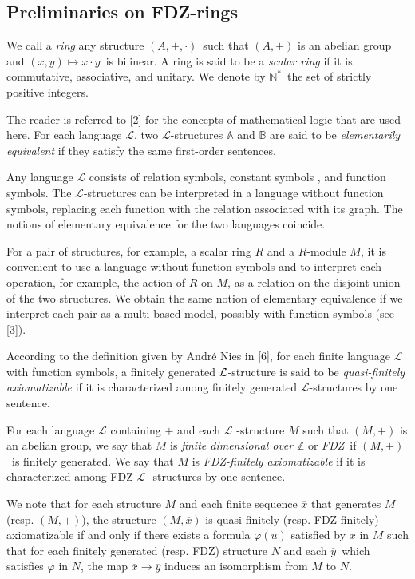 \documentclass{article}
\theoremstyle{remark}
\begin{document}
\subsection{Preliminaries on FDZ-rings}


We call a \emph{ring} any structure $(A,+,\cdot)$\ such that $(A,+)$ is an
abelian group and $(x,y)\mapsto x\cdot y$\ is bilinear. A ring is said to be a 
\emph{scalar ring} if it is commutative, associative, and unitary. We denote
by $%
\mathbb{N}
^{\ast }$\ the set of strictly positive integers.

The reader is referred to [2] for the concepts of mathematical logic that
are used here. For each language $\mathcal{L}$, two $\mathcal{L}$-structures 
$\mathbb A$ and  $\mathbb B$ are said to be \emph{elementarily equivalent} if they satisfy the same
first-order sentences.

Any language $\mathcal{L}$ consists of relation symbols, constant symbols
, and function symbols. The $\mathcal{L}$-structures can be interpreted in a
language without function symbols, replacing each function with the relation
associated with its graph. The notions of elementary equivalence for the two
languages coincide.

For a pair of structures, for example, a scalar ring $R$ and a $R$-module $M$, it
is convenient to use a language without function symbols and to interpret each
operation, for example, the action of $R$ on $M$, as a relation on the
disjoint union of the two structures. We obtain the same notion of
elementary equivalence if we interpret each pair as a multi-based model,
possibly with function symbols (see [3]).

According to the definition given by Andr\'{e} Nies in [6], for each finite
language $\mathcal{L}$ with function symbols, a finitely generated $\mathcal{%
L}$-structure is said to be \emph{quasi-finitely axiomatizable} if it is
characterized among finitely generated $\mathcal{L}$-structures by one
sentence.

For each language $\mathcal{L}$ containing $+$ and each $\mathcal{L}$
-structure $M$ such that $(M,+)$ is an abelian group, we say that $M$ is 
\emph{finite dimensional over }$%
\mathbb{Z}
$ or \emph{FDZ}\ if $(M,+)$\ is finitely generated. We say that $M$ is \emph{%
FDZ-finitely axiomatizable} if it is characterized among FDZ $\mathcal{L}$%
-structures by one sentence.

We note that for each structure $M$ and each finite sequence $\overline{x}$
that generates $M$ (resp. $(M,+)$), the structure $(M,\overline{x})$ is
quasi-finitely (resp. FDZ-finitely) axiomatizable if and only if there
exists a formula $\varphi (\overline{u})$ satisfied by $\overline{x}$ in $M$
such that for each finitely generated (resp. FDZ) structure $N$ and each $%
\overline{y}$\ which satisfies $\varphi $ in $N$, the map $\overline{x}%
\rightarrow \overline{y}$ induces an isomorphism from $M$ to $N$.\bigskip
\end{document}
